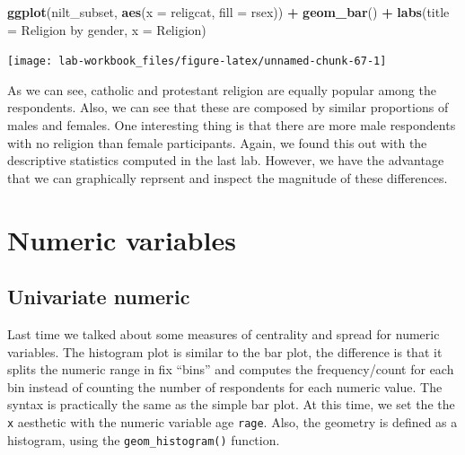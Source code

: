 \documentclass[
]{book}
\newenvironment{Shaded}{\begin{snugshade}}{\end{snugshade}}
\newcommand{\AttributeTok}[1]{\textcolor[rgb]{0.13,0.29,0.53}{#1}}
\newcommand{\FunctionTok}[1]{\textcolor[rgb]{0.13,0.29,0.53}{\textbf{#1}}}
\newcommand{\NormalTok}[1]{#1}
\newcommand{\SpecialCharTok}[1]{\textcolor[rgb]{0.81,0.36,0.00}{\textbf{#1}}}
\newcommand{\StringTok}[1]{\textcolor[rgb]{0.31,0.60,0.02}{#1}}
\begin{document}
\begin{Shaded}
\begin{Highlighting}[]
\FunctionTok{ggplot}\NormalTok{(nilt\_subset, }\FunctionTok{aes}\NormalTok{(}\AttributeTok{x =}\NormalTok{ religcat, }\AttributeTok{fill =}\NormalTok{ rsex)) }\SpecialCharTok{+}
  \FunctionTok{geom\_bar}\NormalTok{() }\SpecialCharTok{+}
  \FunctionTok{labs}\NormalTok{(}\AttributeTok{title =} \StringTok{\textquotesingle{}Religion by gender\textquotesingle{}}\NormalTok{, }\AttributeTok{x =} \StringTok{\textquotesingle{}Religion\textquotesingle{}}\NormalTok{)}
\end{Highlighting}
\end{Shaded}

\begin{flushleft}\texttt{[image: lab-workbook\_files/figure-latex/unnamed-chunk-67-1]} \end{flushleft}

As we can see, catholic and protestant religion are equally popular among the respondents. Also, we can see that these are composed by similar proportions of males and females. One interesting thing is that there are more male respondents with no religion than female participants. Again, we found this out with the descriptive statistics computed in the last lab. However, we have the advantage that we can graphically reprsent and inspect the magnitude of these differences.

\hypertarget{numeric-variables}{%
\section{Numeric variables}\label{numeric-variables}}

\hypertarget{univariate-numeric}{%
\subsection{Univariate numeric}\label{univariate-numeric}}

Last time we talked about some measures of centrality and spread for numeric variables. The histogram plot is similar to the bar plot, the difference is that it splits the numeric range in fix ``bins'' and computes the frequency/count for each bin instead of counting the number of respondents for each numeric value. The syntax is practically the same as the simple bar plot. At this time, we set the the \texttt{x} aesthetic with the numeric variable age \texttt{rage}. Also, the geometry is defined as a histogram, using the \texttt{geom\_histogram()} function.
\end{document}
